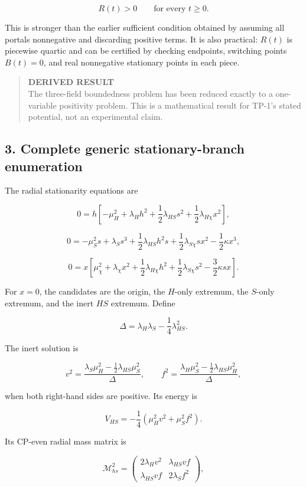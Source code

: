 \documentclass[
]{article}
\begin{document}
\[
R(t)>0\qquad\text{for every }t\ge0.
\]

This is stronger than the earlier sufficient condition obtained by
assuming all portals nonnegative and discarding positive terms. It is
also practical: \(R(t)\) is piecewise quartic and can be certified by
checking endpoints, switching points \(B(t)=0\), and real nonnegative
stationary points in each piece.

\begin{quote}
\textbf{DERIVED RESULT}\\
The three-field boundedness problem has been reduced exactly to a
one-variable positivity problem. This is a mathematical result for
TP-1's stated potential, not an experimental claim.
\end{quote}

\hypertarget{complete-generic-stationary-branch-enumeration}{%
\subsection{3. Complete generic stationary-branch
enumeration}\label{complete-generic-stationary-branch-enumeration}}

The radial stationarity equations are

\[
0=h\left[-\mu_H^2+\lambda_Hh^2
+\frac12\lambda_{HS}s^2+\frac12\lambda_{H\chi}x^2\right],
\]

\[
0=-\mu_S^2s+\lambda_Ss^3
+\frac12\lambda_{HS}h^2s+\frac12\lambda_{S\chi}sx^2
-\frac12\kappa x^3,
\]

\[
0=x\left[\mu_\chi^2+\lambda_\chi x^2
+\frac12\lambda_{H\chi}h^2+\frac12\lambda_{S\chi}s^2
-\frac32\kappa sx\right].
\]

For \(x=0\), the candidates are the origin, the \(H\)-only extremum, the
\(S\)-only extremum, and the inert \(HS\) extremum. Define

\[
\Delta=\lambda_H\lambda_S-\frac14\lambda_{HS}^2.
\]

The inert solution is

\[
v^2=\frac{\lambda_S\mu_H^2-\frac12\lambda_{HS}\mu_S^2}{\Delta},
\qquad
f^2=\frac{\lambda_H\mu_S^2-\frac12\lambda_{HS}\mu_H^2}{\Delta},
\]

when both right-hand sides are positive. Its energy is

\[
V_{HS}=-\frac14\left(\mu_H^2v^2+\mu_S^2f^2\right).
\]

Its CP-even radial mass matrix is

\[
\mathcal M^2_{hs}=
\begin{pmatrix}
2\lambda_Hv^2&\lambda_{HS}vf\\
\lambda_{HS}vf&2\lambda_Sf^2
\end{pmatrix},
\]
\end{document}
